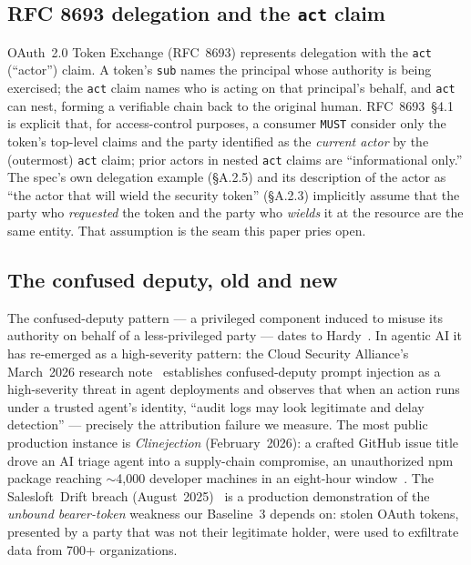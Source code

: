 \documentclass[11pt]{article}
\newcommand{\code}[1]{\texttt{#1}}
\begin{document}
\subsection{RFC 8693 delegation and the \texttt{act} claim}
OAuth~2.0 Token Exchange (RFC~8693) represents delegation with the \code{act}
(``actor'') claim. A token's \code{sub} names the principal whose authority is
being exercised; the \code{act} claim names who is acting on that principal's
behalf, and \code{act} can nest, forming a verifiable chain back to the original
human. RFC~8693~\S4.1 is explicit that, for access-control purposes, a consumer
\code{MUST} consider only the token's top-level claims and the party identified
as the \emph{current actor} by the (outermost) \code{act} claim; prior actors in
nested \code{act} claims are ``informational only.'' The spec's own delegation
example (\S A.2.5) and its description of the actor as ``the actor that will
wield the security token'' (\S A.2.3) implicitly assume that the party who
\emph{requested} the token and the party who \emph{wields} it at the resource are
the same entity. That assumption is the seam this paper pries open.

\subsection{The confused deputy, old and new}
The confused-deputy pattern --- a privileged component induced to misuse its
authority on behalf of a less-privileged party --- dates to
Hardy~\cite{hardy1988}. In agentic AI it has re-emerged as a high-severity
pattern: the Cloud Security Alliance's March~2026 research
note~\cite{csa2026} establishes confused-deputy prompt injection as a
high-severity threat in agent deployments and observes that when an action runs
under a trusted agent's identity, ``audit logs may look legitimate and delay
detection'' --- precisely the attribution failure we measure. The most public
production instance is \emph{Clinejection} (February~2026): a crafted GitHub
issue title drove an AI triage agent into a supply-chain compromise, an
unauthorized npm package reaching $\sim$4{,}000 developer machines in an eight-hour
window~\cite{clinejection}. The Salesloft~Drift breach
(August~2025)~\cite{salesloft} is a production demonstration of the
\emph{unbound bearer-token} weakness our Baseline~3 depends on: stolen OAuth
tokens, presented by a party that was not their legitimate holder, were used to
exfiltrate data from 700+ organizations.
\end{document}
